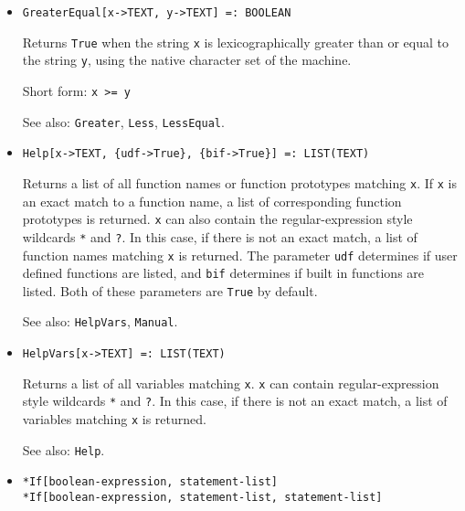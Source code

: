 \begin{itemize}
\item{}
\protect \large \begin{verbatim}
GreaterEqual[x->TEXT, y->TEXT] =: BOOLEAN 
\end{verbatim}\normalsize

\bd
Returns \verb+True+ when the string \verb+x+ is lexicographically greater than
or equal to the string \verb+y+, using the native character set of the
machine.
\item
[Short form:] \verb+x >= y+
\item
[See also:] {\tt Greater}, {\tt Less}, {\tt LessEqual}.
\ed



\item{}
\protect \large \begin{verbatim}
Help[x->TEXT, {udf->True}, {bif->True}] =: LIST(TEXT) 
\end{verbatim}\normalsize

\bd 
Returns a list of all function names or function prototypes matching
\verb+x+.  If \verb+x+ is an exact match to a function name, a list of
corresponding function prototypes is returned.  \verb+x+ can also
contain the regular-expression style wildcards \verb+*+ and \verb+?+.
In this case, if there is not an exact match, a list of function names
matching \verb+x+ is returned.  The parameter \verb+udf+ determines if
user defined functions are listed, and \verb+bif+ determines if built
in functions are listed.  Both of these parameters are \verb+True+ by
default.
\item
[See also:] \verb+HelpVars+, \verb+Manual+.
\ed

\item{}
\protect \large \begin{verbatim}
HelpVars[x->TEXT] =: LIST(TEXT) 
\end{verbatim}\normalsize

\bd 
Returns a list of all variables matching \verb+x+.  \verb+x+ can
contain regular-expression style wildcards \verb+*+ and \verb+?+. 
In this case,
if there is not an exact match, a list of variables matching \verb+x+
is returned.
\item [See also:] \verb+Help+.
\ed


\item{} 
\protect \large \begin{verbatim}
*If[boolean-expression, statement-list]
*If[boolean-expression, statement-list, statement-list]
\end{verbatim} \normalsize
  

\end{itemize}
